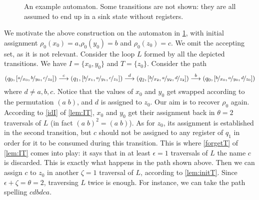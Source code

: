 \begin{figure}[t]
\begin{center}

\end{center}
\caption{\label{fig:upwords-ex} An example automaton. Some transitions are not shown: they are all assumed to end up in a sink state without registers.}
\end{figure}

\begin{example} We motivate the above construction on the automaton in \cref{fig:upwords-ex}, with initial assignment $\rho_0(x_0) = a$,$\rho_0(y_0) = b$ and $\rho_0(z_0) = c$. We omit the accepting set, as it is not relevant. Consider the loop $L$ formed by all the depicted transitions.
We have $I = \{x_0,y_0\}$ and $T = \{z_0\}$. Consider the path
\[
	(q_0,[\nicefrac{a}{x_0},\nicefrac{b}{y_0},\nicefrac{c}{z_0}]) \overset{c}{\longrightarrow} (q_1,[\nicefrac{b}{x_1},\nicefrac{a}{y_1},\nicefrac{c}{z_1}]) \overset{d}{\longrightarrow} (q_2,[\nicefrac{b}{x_2},\nicefrac{a}{y_2},\nicefrac{d}{z_2}]) \overset{b}{\longrightarrow} (q_0,[\nicefrac{b}{x_0},\nicefrac{a}{y_0},\nicefrac{d}{z_0}])
\]
where $d \neq a,b,c$. Notice that the values of $x_0$ and $y_0$ get swapped according to the permutation $(a \; b)$, and $d$ is assigned to $z_0$. Our aim is to recover $\rho_0$ again. According to \eqref{idI} of \cref{lem:IT}, $x_0$ and $y_0$ get their assignment back in $\theta = 2$ traversals of $L$ (in fact $(a\; b)^2 = (a\; b)$). As for $z_0$, its assignment is established in the second transition, but $c$ should not be assigned to any register of $q_1$ in order for it to be consumed during this transition. This is where \eqref{forgetT} of \cref{lem:IT} comes into play: it says that in at least $\epsilon = 1$ traversals of $L$ the name $c$ is discarded. This is exactly what happens in the path shown above. Then we can assign $c$ to $z_0$ in another $\zeta = 1$ traversal of $L$, according to \cref{lem:initT}. Since $\epsilon + \zeta  = \theta = 2$, traversing $L$ twice is enough. For instance, we can take the path spelling $cdbdca$.
\end{example}


